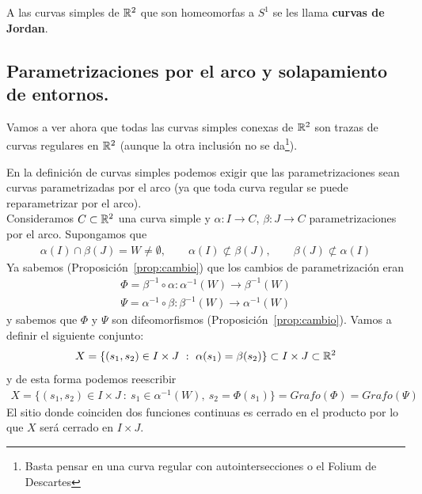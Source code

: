 \begin{definicion}
    A las curvas simples de $\mathbb{R}^2$ que son homeomorfas a $S^1$ se les llama \textbf{curvas de Jordan}.
\end{definicion}

\subsection{Parametrizaciones por el arco y solapamiento de entornos.}

Vamos a ver ahora que todas las curvas simples conexas de $\mathbb{R}^2$ son trazas de curvas regulares en $\mathbb{R}^2$ (aunque la otra inclusión no se da\footnote{Basta pensar en una curva regular con autointersecciones o el Folium de Descartes}).

\begin{observacion}
    En la definición de curvas simples podemos exigir que las parametrizaciones sean curvas parametrizadas por el arco (ya que toda curva regular se puede reparametrizar por el arco).\\

    Consideramos $C\subset \mathbb{R}^2$ una curva simple y $\alpha:I \to C$, $\beta: J \to C$ parametrizaciones por el arco. Supongamos que
    \begin{gather*}
        \alpha(I)\cap \beta(J)=W\neq \emptyset, \qquad \alpha(I)\not\subset\beta(J), \qquad \beta(J)\not\subset \alpha(I)
    \end{gather*}
    Ya sabemos (Proposición~\ref{prop:cambio}) que los cambios de parametrización eran
    \begin{gather*}
        \Phi = \beta^{-1} \circ \alpha : \alpha^{-1}(W) \to \beta^{-1}(W)\\
        \Psi = \alpha^{-1} \circ \beta : \beta^{-1}(W) \to \alpha^{-1}(W)
    \end{gather*}
    y sabemos que $\Phi$ y $\Psi$ son difeomorfismos (Proposición~\ref{prop:cambio}). Vamos a definir el siguiente conjunto:
    \begin{gather*}
        X=\{(s_1, s_2) \in I\times J \ : \ \alpha(s_1)=\beta(s_2)\} \subset I \times J \subset \mathbb{R}^2
    \end{gather*}
    y de esta forma podemos reescribir
    \begin{gather*}
        X=\{(s_1, s_2) \in I\times J \ : \ s_1 \in \alpha^{-1}(W), \ s_2 = \Phi(s_1)\} = Grafo(\Phi) = Grafo(\Psi) 
    \end{gather*}
    El sitio donde coinciden dos funciones continuas es cerrado en el producto por lo que $X$ será cerrado en $I\times J$.\\


\end{observacion}

